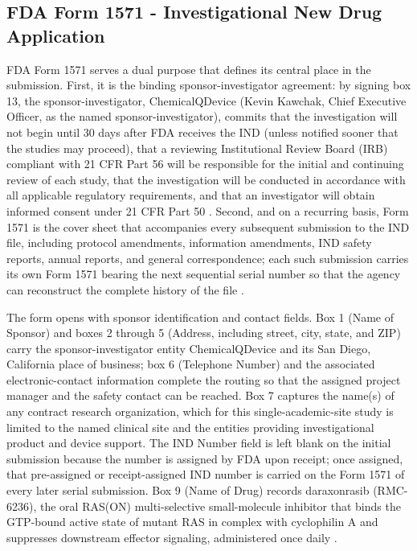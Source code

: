 \subsection{FDA Form 1571 - Investigational New Drug Application}

FDA Form 1571 serves a dual purpose that defines its central place in the
submission. First, it is the binding sponsor-investigator agreement: by
signing box 13, the sponsor-investigator, ChemicalQDevice (Kevin Kawchak,
Chief Executive Officer, as the named sponsor-investigator), commits that
the investigation will not begin until 30 days after FDA receives the IND
(unless notified sooner that the studies may proceed), that a reviewing
Institutional Review Board (IRB) compliant with 21 CFR Part 56 will be
responsible for the initial and continuing review of each study, that the
investigation will be conducted in accordance with all applicable
regulatory requirements, and that an investigator will obtain informed
consent under 21 CFR Part 50 \cite{cfr050paiuni, ichpaistduni}. Second,
and on a recurring basis, Form 1571 is the cover sheet that accompanies
every subsequent submission to the IND file, including protocol
amendments, information amendments, IND safety reports, annual reports,
and general correspondence; each such submission carries its own Form 1571
bearing the next sequential serial number so that the agency can
reconstruct the complete history of the file \cite{phase1guidance}.

The form opens with sponsor identification and contact fields. Box 1
(Name of Sponsor) and boxes 2 through 5 (Address, including street, city,
state, and ZIP) carry the sponsor-investigator entity ChemicalQDevice and
its San Diego, California place of business; box 6 (Telephone Number)
and the associated electronic-contact information complete the routing so
that the assigned project manager and the safety contact can be reached.
Box 7 captures the name(s) of any contract research organization, which
for this single-academic-site study is limited to the named clinical site
and the entities providing investigational product and device support.
The IND Number field is left blank on the initial submission because the
number is assigned by FDA upon receipt; once assigned, that pre-assigned
or receipt-assigned IND number is carried on the Form 1571 of every later
serial submission. Box 9 (Name of Drug) records daraxonrasib (RMC-6236),
the oral RAS(ON) multi-selective small-molecule inhibitor that binds the
GTP-bound active state of mutant RAS in complex with cyclophilin A and
suppresses downstream effector signaling, administered once daily
\cite{daraxwhipple, pdac060s2030}.

